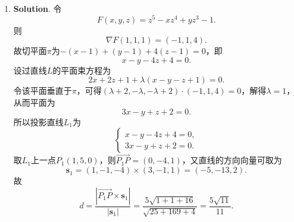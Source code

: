 \documentclass[../main.tex]{subfiles}
\begin{document}
\begin{enumerate}
          计算$\left.\frac{\partial f}{\partial \boldsymbol{l}}\right|_{M_1}=\sqrt{2}\left(\frac{1}{2}+\frac{1}{2}\right)=\sqrt{2}$，$\left.\frac{\partial f}{\partial \boldsymbol{l}}\right|_{M_2}=\sqrt{2}\left(-\frac{1}{2}-\frac{1}{2}\right)=-\sqrt{2}$，

          所以在椭球面上的点$\left(\frac{1}{2},-\frac{1}{2},0\right)$处函数$f$沿方向$\boldsymbol{l}$的方向导数最大，最大值为$\sqrt{2}$.

    \item \textbf{Solution}. 令
          \[
              F(x,y,z)=z^5-xz^4+yz^3-1.
          \]
          则
          \[
              \nabla F(1,1,1)=(-1,1,4).
          \]
          故切平面$\pi$为$-(x-1)+(y-1)+4(z-1)=0$，即
          \[
              x-y-4z+4=0.
          \]
          设过直线$L$的平面束方程为
          \[
              2x+2z+1+\lambda(x-y-z+1)=0.
          \]
          令该平面垂直于$\pi$，可得$(\lambda+2,-\lambda,-\lambda+2)\cdot(-1,1,4)=0$，解得$\lambda=1$，从而平面为
          \[
              3x-y+z+2=0.
          \]
          所以投影直线$L_1$为
          \[
              \begin{cases}
                  x-y-4z+4=0, \\
                  3x-y+z+2=0.
              \end{cases}
          \]
          取$L_1$上一点$P_1(1,5,0)$，则$\overrightarrow{P_1P}=(0,-4,1)$，又直线的方向向量可取为
          \[
              \boldsymbol{s}_1=(1,-1,-4)\times(3,-1,1)=(-5,-13,2).
          \]
          故
          \[
              d=\frac{|\overrightarrow{P_1P}\times\boldsymbol{s}_1|}{|\boldsymbol{s}_1|}
              =\frac{5\sqrt{1+1+16}}{\sqrt{25+169+4}}=\frac{5\sqrt{11}}{11}.
          \]


\end{enumerate}
\end{document}
